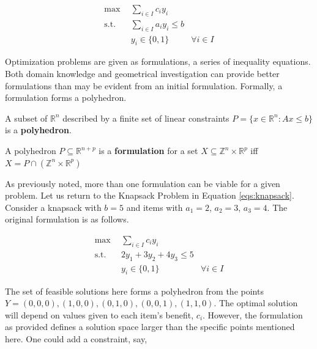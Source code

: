 \begin{subequations}\label{eqs:knapsack}
  \begin{align}
    \max \:\: & 
    \sum_{i \in I} c_i y_i
    & \\
    \text{s.t.} \:\: &
    \sum_{i \in I} a_i y_i \leq b 
    & \\
    &
    y_i \in \{ 0, 1 \}
    &
    \forall i \in I
  \end{align}
\end{subequations}

Optimization problems are given as formulations, a series of inequality
equations. Both domain knowledge and geometrical investigation can provide
better formulations than may be evident from an initial formulation. Formally, a
formulation forms a polyhedron.

\begin{define}\label{def:polyhedron}
A subset of $\mathbb{R}^n$ described by a finite set of linear constraints $P
= \{ x \in \mathbb{R}^n : Ax \leq b\}$ is a \textbf{polyhedron}.
\end{define}

\begin{define}\label{def:formulation}
A polyhedron $P \subseteq \mathbb{R}^{n+p}$ is a \textbf{formulation} for a set
$X \subseteq \mathbb{Z}^n \times \mathbb{R}^p$ iff $X = P \cap \left( 
\mathbb{Z}^n \times \mathbb{R}^p \right)$
\end{define}

As previously noted, more than one formulation can be viable for a given
problem. Let us return to the Knapsack Problem in
Equation \ref{eqs:knapsack}. Consider a knapsack with $b = 5$ and items with
$a_1 = 2$, $a_2 = 3$, $a_3 = 4$. The original formulation is as follows.

\begin{subequations}\label{eqs:knapsack1}
  \begin{align}
    \max \:\: & 
    \sum_{i \in I} c_i y_i
    & \\
    \text{s.t.} \:\: &
    2y_1 + 3y_2 + 4y_3 \leq 5 
    & \\
    &
    y_i \in \{ 0, 1 \}
    &
    \forall i \in I
  \end{align}
\end{subequations}

The set of feasible solutions here forms a polyhedron from the points $Y = {(0,
0, 0), (1, 0, 0), (0, 1, 0), (0, 0, 1), (1, 1, 0)}$. The optimal solution will
depend on values given to each item's benefit, $c_i$. However, the formulation
as provided defines a solution space larger than the specific points mentioned
here. One could add a constraint, say, 


